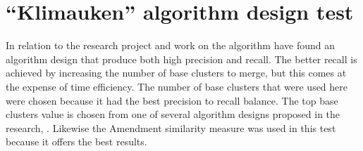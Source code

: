 


\section{``Klimauken'' algorithm design test}
In relation to the  research project and work on the \CTC algorithm \cite{Moe2013compact} have found an algorithm design that produce both high precision and recall. The better recall is achieved by increasing the number of base clusters to merge, but this comes at the expense of time efficiency. The number of base clusters that were used here were chosen because it had the best precision to recall balance. The top base clusters value is chosen from one of several algorithm designs proposed in the research, \parencite{Moe2013compact}. Likewise the Amendment similarity measure was used in this test because it offers the best results.

